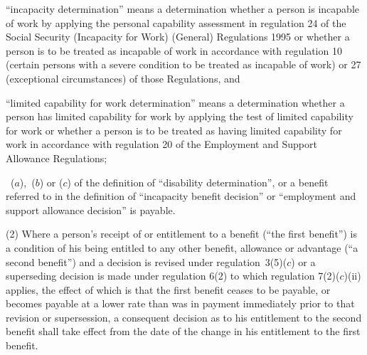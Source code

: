 \documentclass[12pt,a4paper]{article}
\begin{document}
\begin{enumerate}
“incapacity determination” means a determination whether a person is incapable of work by applying the 
personal capability assessment  %
in regulation 24 of the Social Security (Incapacity for Work) (General) Regulations 1995 or whether a person is to be treated as incapable of work in accordance with regulation 10 (certain persons with a severe condition to be treated as incapable of work) or 27 (exceptional circumstances) of those Regulations, and

“limited capability for work determination” means a determination whether a person has limited capability for work by applying the test of limited capability for work or whether a person is to be treated as having limited capability for work in accordance with regulation 20 of the Employment and Support Allowance Regulations;

~($a$),~($b$) or ($c$) of the definition of ``disability determination'', or a benefit referred to in the definition of ``incapacity benefit decision'' 
or ``employment and support allowance decision''  %
is payable.
\end{enumerate}

(2) Where a person’s receipt of or entitlement to a benefit (“the first benefit”) is a condition of his being entitled to any other benefit, allowance or advantage (“a second benefit”) and a decision is revised under regulation~3(5)($c$) or a superseding decision is made under regulation 6(2) to which regulation 7(2)($c$)(ii) applies, the effect of which is that the first benefit ceases to be payable, or becomes payable at a lower rate than was in payment immediately prior to that revision or supersession, a consequent decision as to his entitlement to the second benefit shall take effect from the date of the change in his entitlement to the first benefit.
\end{document}
